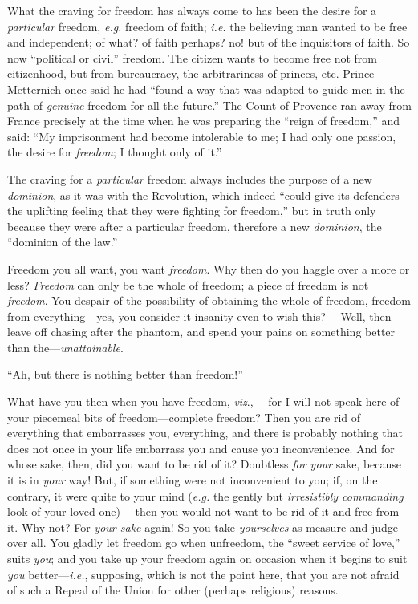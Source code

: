 What the craving for freedom has always come to has been the desire for a 
\textit{particular} freedom, \textit{e.g.} freedom of faith; \textit{i.e.} 
the believing man wanted to be free and independent; of what? of faith 
perhaps? no! but of the inquisitors of faith. So now ``political or civil'' 
freedom. The citizen wants to become free not from citizenhood, but from 
bureaucracy, the arbitrariness of princes, etc. Prince Metternich once said he 
had ``found a way that was adapted to guide men in the path of 
\textit{genuine} freedom for all the future.'' The Count of Provence ran away 
from France precisely at the time when he was preparing the ``reign of 
freedom,'' and said: ``My imprisonment had become intolerable to me; I had 
only one passion, the desire for \textit{freedom}; I thought only of it.''

The craving for a \textit{particular} freedom always includes the purpose of a 
new \textit{dominion}, as it was with the Revolution, which indeed ``could 
give its defenders the uplifting feeling that they were fighting for 
freedom,'' but in truth only because they were after a particular freedom, 
therefore a new \textit{dominion}, the ``dominion of the law.''

Freedom you all want, you want \textit{freedom}. Why then do you haggle over a 
more or less? \textit{Freedom} can only be the whole of freedom; a piece of 
freedom is not \textit{freedom}. You despair of the possibility of obtaining 
the whole of freedom, freedom from everything---yes, you consider it insanity 
even to wish this? ---Well, then leave off chasing after the phantom, and 
spend your pains on something better than the---\textit{unattainable}.

``Ah, but there is nothing better than freedom!''

What have you then when you have freedom, \textit{viz}., ---for I will not 
speak here of your piecemeal bits of freedom---complete freedom? Then you are 
rid of everything that embarrasses you, everything, and there is probably 
nothing that does not once in your life embarrass you and cause you 
inconvenience. And for whose sake, then, did you want to be rid of it? 
Doubtless \textit{for your} sake, because it is in \textit{your} way! But, if 
something were not inconvenient to you; if, on the contrary, it were quite to 
your mind (\textit{e.g.} the gently but \textit{irresistibly commanding} look 
of your loved one) ---then you would not want to be rid of it and free from 
it. Why not? For \textit{your sake} again! So you take \textit{yourselves} as 
measure and judge over all. You gladly let freedom go when unfreedom, the 
``sweet service of love,'' suits \textit{you}; and you take up your freedom 
again on occasion when it begins to suit \textit{you} better---\textit{i.e.}, 
supposing, which is not the point here, that you are not afraid of such a 
Repeal of the Union for other (perhaps religious) reasons.

